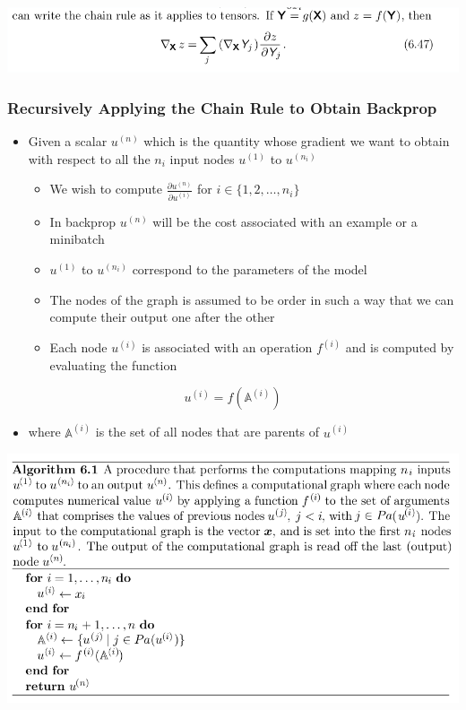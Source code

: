 \documentclass[11pt]{article}
\begin{document}
\begin{center}
\includegraphics[width=.9\linewidth]{Deep Feedforward Networks/screenshot_2018-10-01_18-22-42.png}
\end{center}

\subsubsection{Recursively Applying the Chain Rule to Obtain Backprop}
\label{sec:org9c45613}
\begin{itemize}
\item Given a scalar \(u^{(n)}\) which is the quantity whose gradient we want to obtain with respect to all the \(n_i\) input nodes \(u^{(1)}\) to \(u^{(n_i)}\)
\begin{itemize}
\item We wish to compute \(\frac{\partial u^{(n)}}{\partial u^{(i)}}\) for \(i \in \{1,2,\dots,n_i\}\)
\item In backprop \(u^{(n)}\) will be the cost associated with an example or a minibatch
\item \(u^{(1)}\) to \(u^{(n_i)}\) correspond to the parameters of the model
\item The nodes of the graph is assumed to be order in such a way that we can compute their output one after the other
\item Each node \(u^{(i)}\) is associated with an operation \(f^{(i)}\) and is computed by evaluating the function
\end{itemize}
\end{itemize}
\begin{equation}
  u^{(i)} = f(\mathbb A ^{(i)})
\end{equation}
\begin{itemize}
\item where \(\mathbb A ^{(i)}\) is the set of all nodes that are parents of \(u^{(i)}\)
\end{itemize}
\begin{center}
\includegraphics[width=.9\linewidth]{Deep Feedforward Networks/screenshot_2018-10-02_08-04-33.png}
\end{center}
\end{document}

